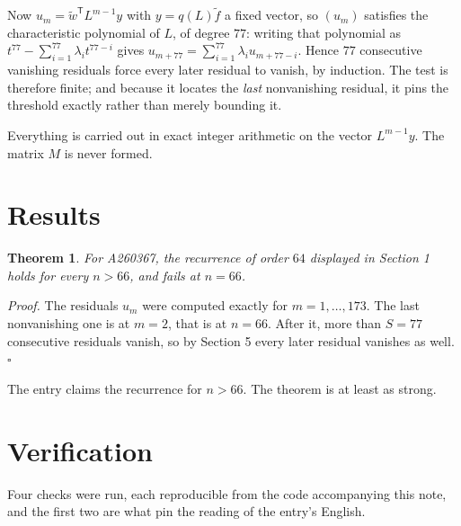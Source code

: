 \documentclass[11pt]{article}
\newtheorem{theorem}{Theorem}
\theoremstyle{definition}
\begin{document}
Now $u_m = \tilde w^{\mathsf T} L^{m-1} y$ with $y = q(L)\tilde f$ a fixed vector, so $(u_m)$ satisfies the characteristic polynomial of $L$, of degree $77$: writing that polynomial as $t^{77} - \sum_{i=1}^{77} \lambda_i t^{77-i}$ gives $u_{m+77} = \sum_{i=1}^{77} \lambda_i u_{m+77-i}$. Hence $77$ consecutive vanishing residuals force every later residual to vanish, by induction. The test is therefore finite; and because it locates the {\itshape last} nonvanishing residual, it pins the threshold exactly rather than merely bounding it.

Everything is carried out in exact integer arithmetic on the vector $L^{m-1}y$. The matrix $M$ is never formed.

\section{Results}

\begin{theorem} For A260367, the recurrence of order $64$ displayed in Section 1 holds for every $n > 66$, and fails at $n = 66$.\end{theorem}

{\itshape Proof.} The residuals $u_m$ were computed exactly for $m = 1,\dots,173$. The last nonvanishing one is at $m = 2$, that is at $n = 66$. After it, more than $S = 77$ consecutive residuals vanish, so by Section 5 every later residual vanishes as well. $\square$

The entry claims the recurrence for $n > 66$. The theorem is at least as strong.

\section{Verification}

Four checks were run, each reproducible from the code accompanying this note, and the first two are what pin the reading of the entry's English.
\end{document}
